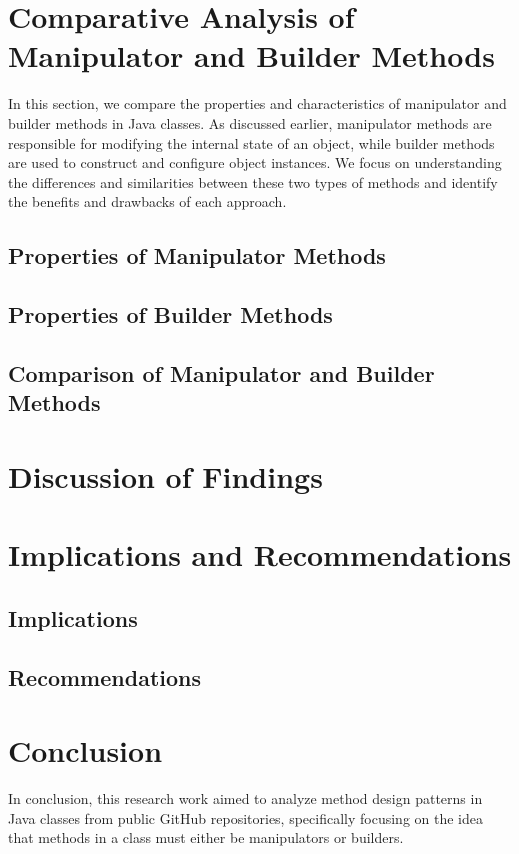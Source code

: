 \documentclass[draft]{article}
\begin{document}
\newpage
\section{Comparative Analysis of Manipulator and Builder Methods}
In this section, we compare the properties and characteristics of manipulator and builder methods in Java classes. As discussed earlier, manipulator methods are responsible for modifying the internal state of an object, while builder methods are used to construct and configure object instances. We focus on understanding the differences and similarities between these two types of methods and identify the benefits and drawbacks of each approach.
\subsection{Properties of Manipulator Methods}
\subsection{Properties of Builder Methods}
\subsection{Comparison of Manipulator and Builder Methods}

\newpage
\section{Discussion of Findings}

\newpage
\section{Implications and Recommendations}
\subsection{Implications}
\subsection{Recommendations}

\newpage
\section{Conclusion}
In conclusion, this research work aimed to analyze method design patterns in Java classes from public GitHub repositories, specifically focusing on the idea that methods in a class must either be manipulators or builders.\\
~\\
\end{document}
